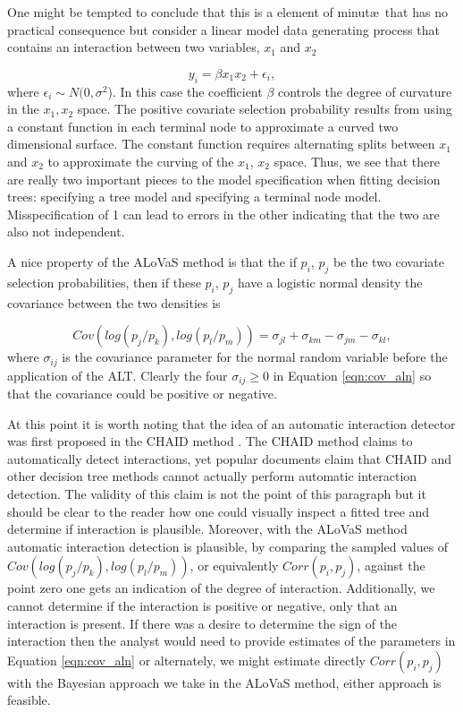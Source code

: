 

One might be tempted to conclude that this is a element of minut\ae\ that has no practical consequence but consider a linear model data generating process that contains an interaction between two variables, $x_1$ and $x_2$

\begin{equation}\label{eqn:interaction_model}
y_i = \beta x_1x_2 + \epsilon_i,
\end{equation}  
where $\epsilon_i \sim N(0, \sigma^2$). In this case the coefficient $\beta$ controls the degree of curvature in the $x_1, x_2$ space. The positive covariate selection probability results from using a constant function in each terminal node to approximate a curved two dimensional surface. The constant function requires alternating splits between $x_1$ and $x_2$ to approximate the curving of the $x_1$, $x_2$ space. Thus, we see that there are really two important pieces to the model specification when fitting decision trees: specifying a tree model and specifying a terminal node model. Misspecification of 1 can lead to errors in the other indicating that the two are also not independent.

A nice property of the ALoVaS method is that the if $p_i$, $p_j$ be the two covariate selection probabilities, then if these $p_i$, $p_j$ have a logistic normal density the covariance between the two densities is 

\begin{equation}\label{eqn:cov_aln}
Cov(log(p_j / p_k), log(p_l / p_m) ) = \sigma_{jl} + \sigma_{km} - \sigma_{jm} - \sigma_{kl},
\end{equation}
where $\sigma_{ij}$ is the covariance parameter for the normal random variable before the application of the ALT. Clearly the four $\sigma_{ij} \geq 0$ in Equation \ref{eqn:cov_aln} so that the covariance could be positive or negative.  

At this point it is worth noting that the idea of an automatic interaction detector was first proposed in the CHAID method \cite{kass1975significance}. The CHAID method claims to automatically detect interactions, yet popular documents \cite{ville2006decision} claim that CHAID and other decision tree methods cannot actually perform automatic interaction detection. The validity of this claim is not the point of this paragraph but it should be clear to the reader how one could visually inspect a fitted tree and determine if interaction is plausible. Moreover, with the ALoVaS method automatic interaction detection is plausible, by comparing the sampled values of $Cov(log(p_j/p_k), log(p_l/p_m) )$, or equivalently $Corr(p_i, p_j)$, against the point zero one gets an indication of the degree of interaction. Additionally, we cannot determine if the interaction is positive or negative, only that an interaction is present. If there was a desire to determine the sign of the interaction then the analyst would need to provide estimates of the parameters in Equation \ref{eqn:cov_aln} or alternately, we might estimate directly $Corr(p_i, p_j)$ with the Bayesian approach we take in the ALoVaS method, either approach is feasible. 

